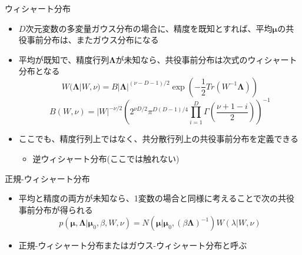 \begin{frame}{ウィシャート分布}
 \begin{itemize}
  \item $D$次元変数の多変量ガウス分布の場合に、\alert{精度を既知}とすれば、平均$\bm{\mu}$の共役事前分布は、またガウス分布になる
  \item \alert{平均が既知}で、精度行列$\bm{\Lambda}$が未知なら、共役事前分布は次式のウィシャート分布となる
        \begin{equation}
         W(\bm{\Lambda}|W,\nu) = B|\bm{\Lambda}|^{(\nu-D-1)/2}\exp\left(-\frac{1}{2}Tr(W^{-1}\bm{\Lambda})\right)
        \end{equation}
        \begin{equation}
         B(W,\nu) = |W|^{-\nu/2}\left(2^{\nu D/2}\pi^{D(D-1)/4}\prod_{i=1}^D\Gamma\left(\frac{\nu+1-i}{2}\right)\right)^{-1}
        \end{equation}
  \item ここでも、精度行列上ではなく、共分散行列上の共役事前分布を定義できる
        \begin{itemize}
         \item 逆ウィシャート分布(ここでは触れない)
        \end{itemize}
 \end{itemize}
\end{frame}

\begin{frame}{正規-ウィシャート分布}
 \begin{itemize}
  \item \alert{平均と精度の両方が未知}なら、1変数の場合と同様に考えることで次の共役事前分布が得られる
        \begin{equation}
         p(\bm{\mu},\bm{\Lambda}|\bm{\mu}_0,\beta,W,\nu) = N(\bm{\mu}|\bm{\mu}_0,(\beta\bm{\Lambda})^{-1})W(\lambda|W,\nu)
        \end{equation}
  \item \alert{正規-ウィシャート分布}または\alert{ガウス-ウィシャート分布}と呼ぶ
 \end{itemize}
\end{frame}
